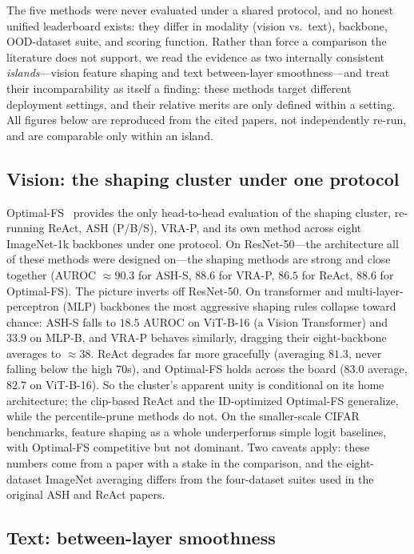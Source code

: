 \documentclass[a4paper]{article}
\begin{document}
The five methods were never evaluated under a shared protocol, and no honest unified
leaderboard exists: they differ in modality (vision vs.\ text), backbone, OOD-dataset
suite, and scoring function. Rather than force a comparison the literature does not
support, we read the evidence as two internally consistent \emph{islands}---vision
feature shaping and text between-layer smoothness---and treat their incomparability
as itself a finding: these methods target different deployment settings, and their
relative merits are only defined within a setting. All figures below are reproduced
from the cited papers, not independently re-run, and are comparable only within an
island.

\subsection{Vision: the shaping cluster under one protocol}
\label{subsec:exp-vision}

Optimal-FS~\citep{optimalfs} provides the only head-to-head evaluation of the shaping
cluster, re-running ReAct, ASH (P/B/S), VRA-P, and its own method across eight
ImageNet-1k backbones under one protocol. On ResNet-50---the architecture all of these
methods were designed on---the shaping methods are strong and close together (AUROC
$\approx 90.3$ for ASH-S, $88.6$ for VRA-P, $86.5$ for ReAct, $88.6$ for Optimal-FS).
The picture inverts off ResNet-50. On transformer and multi-layer-perceptron (MLP)
backbones the most aggressive shaping rules collapse toward chance: ASH-S falls to
$18.5$ AUROC on ViT-B-16 (a Vision Transformer) and
$33.9$ on MLP-B, and VRA-P behaves similarly, dragging their eight-backbone averages to
$\approx 38$. ReAct degrades far more gracefully (averaging $81.3$, never falling below
the high $70$s), and Optimal-FS holds across the board ($83.0$ average, $82.7$ on
ViT-B-16). So the cluster's apparent unity is conditional on its home architecture; the
clip-based ReAct and the ID-optimized Optimal-FS generalize, while the percentile-prune
methods do not. On the smaller-scale CIFAR benchmarks, feature shaping as a whole
underperforms simple logit baselines, with Optimal-FS competitive but not dominant. Two
caveats apply: these numbers come from a paper with a stake in the comparison, and the
eight-dataset ImageNet averaging differs from the four-dataset suites used in the
original ASH and ReAct papers.

\subsection{Text: between-layer smoothness}
\label{subsec:exp-text}
\end{document}
